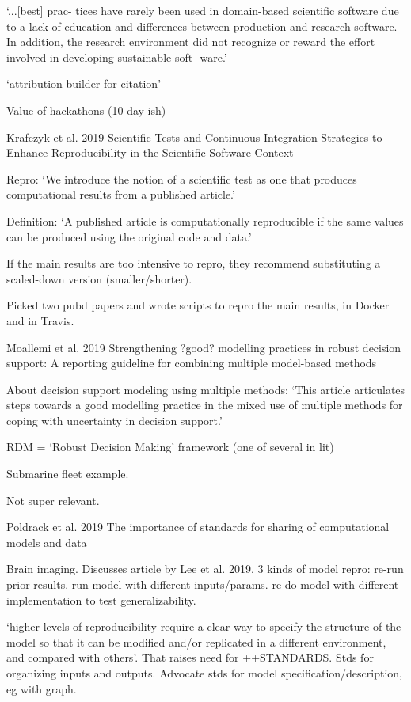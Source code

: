 \documentclass[12pt]{amsart}
\begin{document}
`...[best] prac- tices have rarely been used in domain-based scientific software due to a lack of education and differences between production and research software. In addition, the research environment did not recognize or reward the effort involved in developing sustainable soft- ware.'

`attribution builder for citation'

Value of hackathons (10 day-ish)



Krafczyk et al. 2019 Scientific Tests and Continuous Integration Strategies
to Enhance Reproducibility in the Scientific Software Context

Repro: `We introduce the notion of a scientific test as one that produces computational results from a published article.'

Definition: `A published article is computationally reproducible if the same values can be produced using the original code and data.'

If the main results are too intensive to repro, they recommend substituting a scaled-down version (smaller/shorter).

Picked two pubd papers and wrote scripts to repro the main results, in Docker and in Travis.



Moallemi et al. 2019 Strengthening ?good? modelling practices in robust decision support: A reporting guideline for combining multiple model-based methods

About decision support modeling using multiple methods: `This article articulates steps towards a good modelling practice in the mixed use of multiple methods for coping with uncertainty in decision support.'

RDM = `Robust Decision Making' framework (one of several in lit)

Submarine fleet example.

Not super relevant. 


Poldrack et al. 2019 The importance of standards for sharing of computational models and data

Brain imaging. Discusses article by Lee et al. 2019. 3 kinds of model repro: re-run prior results. run model with different inputs/params. re-do model with different implementation to test generalizability.

`higher levels of reproducibility require a clear way to specify the structure of the model so that it can be modified and/or replicated in a different environment, and compared with others'. That raises need for ++STANDARDS. Stds for organizing inputs and outputs. Advocate stds for model specification/description, eg with graph.
\end{document}
